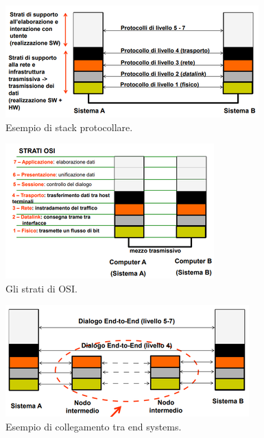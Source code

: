 \documentclass[11pt,a4paper]{article}
\theoremstyle{definition}
\begin{document}
\begin{figure}[!h]
	\includegraphics[scale=0.5]{Immagini/Protocol_stack.png}
	\centering
	\caption{Esempio di stack protocollare.}
\end{figure}
\begin{figure}[!h]
	\includegraphics[scale=0.7]{Immagini/Osi_strati.png}
	\centering
	\caption{Gli strati di OSI.}
\end{figure}
\begin{figure}[!h]
	\includegraphics[scale=0.7]{Immagini/End_sys.png}
	\centering
	\caption{Esempio di collegamento tra end systems.}
\end{figure}
\newpage
\end{document}
